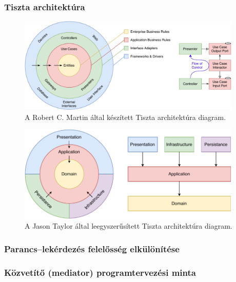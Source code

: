 
\subsubsection{Tiszta architektúra}

\cite{martin_2017_clean-architecture} \cite{martin_2012_the-clean-architecture}

\begin{figure}[h]
    \centering
    \includegraphics[width=0.95\textwidth]{images/clean-architecture_unclebob.pdf}
    \caption{A Robert C. Martin által készített Tiszta architektúra diagram.}
    \label{fig:clean-architecture_unclebob}
\end{figure}

\begin{figure}[h]
    \centering
    \includegraphics[width=0.95\textwidth]{images/clean-architecture_simplified.pdf}
    \caption{A Jason Taylor által leegyszerűsített Tiszta architektúra diagram.}
    \label{fig:clean-architecture_simplified}
\end{figure}

\subsubsection{Parancs--lekérdezés felelősség elkülönítése}

\subsubsection{Közvetítő (mediator) programtervezési minta}

